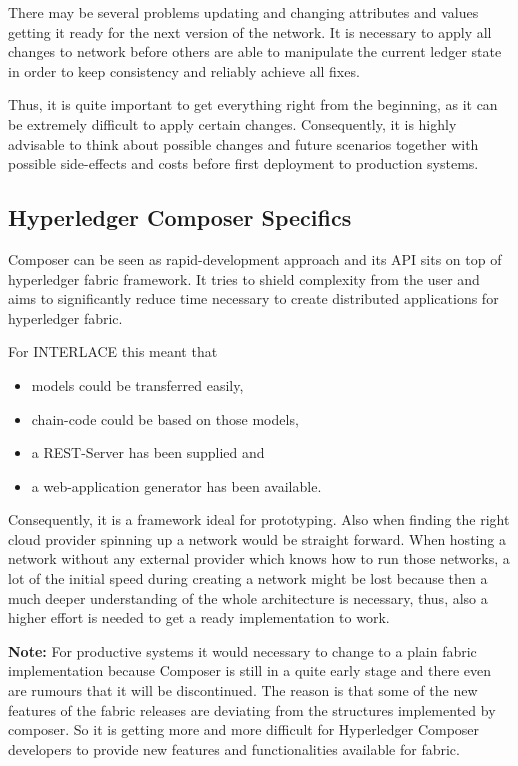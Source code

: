 There may be several problems updating and changing attributes and values getting it ready for the next version of the network. It is necessary to apply all changes to network before others are able to manipulate the current ledger state in order to keep consistency and reliably achieve all fixes.

Thus, it is quite important to get everything right from the beginning, as it can be extremely difficult to apply certain changes. Consequently, it is highly advisable to think about possible changes and future scenarios together with possible side-effects and costs before first deployment to production systems.

\subsection{Hyperledger Composer Specifics}

Composer can be seen as rapid-development approach and its API sits on top of hyperledger fabric framework. It tries to shield complexity from the user and aims to significantly reduce time necessary to create distributed applications for hyperledger fabric.

For INTERLACE this meant that

\begin{itemize}
	\item models could be transferred easily,
	\item chain-code could be based on those models,
	\item a REST-Server has been supplied and
	\item a web-application generator has been available.
\end{itemize}

Consequently, it is a framework ideal for prototyping. Also when finding the right cloud provider spinning up a network would be straight forward. When hosting a network without any external provider which knows how to run those networks, a lot of the initial speed during creating a network might be lost because then a much deeper understanding of the whole architecture is necessary, thus, also a higher effort is needed to get a ready implementation to work.

\textbf{Note:} For productive systems it would necessary to change to a plain fabric implementation because Composer is still in a quite early stage and there even are rumours that it will be discontinued. The reason is that some of the new features of the fabric releases are deviating from the structures implemented by composer. So it is getting more and more difficult for Hyperledger Composer developers to provide new features and functionalities available for fabric.

